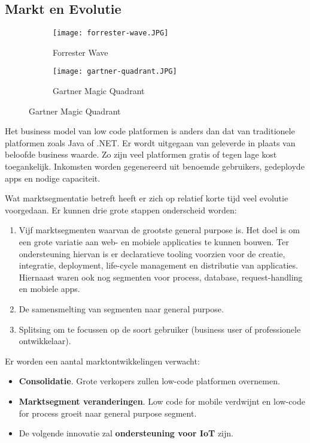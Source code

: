 \subsection{Markt en Evolutie}
\label{sec:markt-en-evolutie}

\begin{figure}[h!]
    \centering
    \begin{subfigure}[b]{0.4\linewidth}
        \texttt{[image: forrester-wave.JPG]}
        \caption{Forrester Wave \autocite{Rymer2019}}
    \end{subfigure}
    \begin{subfigure}[b]{0.4\linewidth}
        \texttt{[image: gartner-quadrant.JPG]}
        \caption{Gartner Magic Quadrant \autocite{Vincent2019}}
    \end{subfigure}
    \label{fig:quadwave}
\end{figure}

Het business model van low code platformen is anders dan dat van traditionele platformen zoals Java of .NET. Er wordt uitgegaan van geleverde in plaats van beloofde business waarde. Zo zijn veel platformen gratis of tegen lage kost toegankelijk. Inkomsten worden gegenereerd uit benoemde gebruikers, gedeployde apps en nodige capaciteit. \autocite{Richardson2016}

Wat marktsegmentatie betreft heeft er zich op relatief korte tijd veel evolutie voorgedaan. Er kunnen drie grote stappen onderscheid worden:
\begin{enumerate}
    \item Vijf marktsegmenten waarvan de grootste general purpose is. Het doel is om een grote variatie aan web- en mobiele applicaties te kunnen bouwen. Ter ondersteuning hiervan is er declaratieve tooling voorzien voor de creatie, integratie, deployment, life-cycle management en distributie van applicaties. Hiernaast waren ook nog segmenten voor process, database, request-handling en mobiele apps.
    \item De samensmelting van segmenten naar general purpose. %
    \item Splitsing om te focussen op de soort gebruiker (business user of professionele ontwikkelaar). %
\end{enumerate}

Er worden een aantal marktontwikkelingen verwacht:
\begin{itemize}
    \item \textbf{Consolidatie}. Grote verkopers zullen low-code platformen overnemen.
    \item \textbf{Marktsegment veranderingen}. Low code for mobile verdwijnt en low-code for process groeit naar general purpose segment.
    \item De volgende innovatie zal \textbf{ondersteuning voor IoT} zijn.
\end{itemize} \autocite{Richardson2016}

